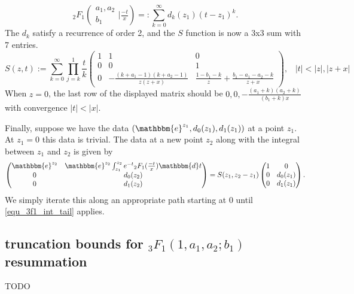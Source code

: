 \documentclass[12pt]{article}
\newcommand{\ee}[0] {\mathbbm{e}}
\newcommand{\dd}[0] {\mathbbm{d}}
\numberwithin{equation}{section}
\newcommand{\FFs}[6] {{}_{#1}{#2}_{#3} ( \begin{smallmatrix} #4 \\ #5 \end{smallmatrix} | {#6}  )}
\begin{document}
\begin{equation*}
\FFs{2}{F}{1}{a_1,a_2}{b_1}{\tfrac{-t}{x}} =: \sum_{k=0}^{\infty} d_k(z_1) (t-z_1)^k\text{.}
\end{equation*}
The $d_k$ satisfy a recurrence of order 2, and the $S$ function is now a 3x3 sum with 7 entries.
\begin{equation*}
S(z,t) := \sum_{k=0}^{\infty} \prod_{j=k}^{1} \frac{t}{k} \begin{pmatrix} 1 & 1 & 0\\ 0 & 0 & 1 \\ 0 & -\frac{(k+a_1-1)(k+a_2-1)}{z (z+x)} & \frac{1-b_1-k}{z}+ \frac{b_1-a_1-a_2-k}{z+x} \end{pmatrix}\text{,} \quad |t| < |z|,|z+x|
\end{equation*}
When $z=0$, the last row of the displayed matrix should be $0,0,-\tfrac{(a_1+k)(a_2+k)}{(b_1+k)x}$ with convergence $|t| < |x|$.

Finally, suppose we have the data $(\ee^{z_1}, d_0(z_1), d_1(z_1))$ at a point $z_1$. At $z_1=0$ this data is trivial. The data at a new point $z_2$ along with the integral between $z_1$ and $z_2$ is given by
\begin{equation*}
\begin{pmatrix}
\ee^{z_2} & \ee^{z_2} \int_{z_1}^{z_2} e^{-t} {}_2 F_1(\tfrac{-t}{x}) \dd t \\
0 & d_0(z_2)\\
0 & d_1(z_2)
\end{pmatrix} = 
S(z_1,z_2-z_1)
\begin{pmatrix}
1 & 0\\
0 & d_0(z_1)\\
0 & d_1(z_1)
\end{pmatrix}\text{.}
\end{equation*}
We simply iterate this along an appropriate path starting at $0$ until \eqref{equ_3f1_int_tail} applies.

\subsection{truncation bounds for ${}_3 F_1(1,a_1,a_2;b_1)$ resummation}
TODO
\end{document}
